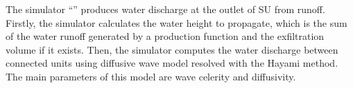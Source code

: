 The simulator ``\englishname'' produces water discharge at the outlet of SU 
from runoff. Firstly, the simulator calculates the water height to 
propagate, which is the sum of the water runoff generated by a production 
function and the exfiltration volume if it exists. Then, the simulator 
computes the water discharge between connected units using diffusive wave 
model resolved with the Hayami method. The main parameters of this model are 
wave celerity and diffusivity.
